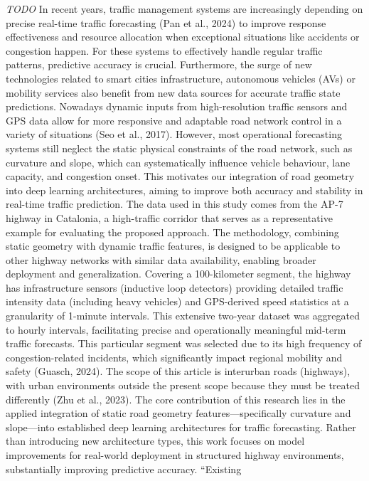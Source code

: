 \documentclass[
  letterpaper,
  DIV=11,
  numbers=noendperiod]{scrartcl}
\begin{document}
\emph{TODO} In recent years, traffic management systems are increasingly
depending on precise real-time traffic forecasting (Pan et al., 2024) to
improve response effectiveness and resource allocation when exceptional
situations like accidents or congestion happen. For these systems to
effectively handle regular traffic patterns, predictive accuracy is
crucial. Furthermore, the surge of new technologies related to smart
cities infrastructure, autonomous vehicles (AVs) or mobility services
also benefit from new data sources for accurate traffic state
predictions. Nowadays dynamic inputs from high-resolution traffic
sensors and GPS data allow for more responsive and adaptable road
network control in a variety of situations (Seo et al., 2017). However,
most operational forecasting systems still neglect the static physical
constraints of the road network, such as curvature and slope, which can
systematically influence vehicle behaviour, lane capacity, and
congestion onset. This motivates our integration of road geometry into
deep learning architectures, aiming to improve both accuracy and
stability in real-time traffic prediction. The data used in this study
comes from the AP-7 highway in Catalonia, a high-traffic corridor that
serves as a representative example for evaluating the proposed approach.
The methodology, combining static geometry with dynamic traffic
features, is designed to be applicable to other highway networks with
similar data availability, enabling broader deployment and
generalization. Covering a 100-kilometer segment, the highway has
infrastructure sensors (inductive loop detectors) providing detailed
traffic intensity data (including heavy vehicles) and GPS-derived speed
statistics at a granularity of 1-minute intervals. This extensive
two-year dataset was aggregated to hourly intervals, facilitating
precise and operationally meaningful mid-term traffic forecasts. This
particular segment was selected due to its high frequency of
congestion-related incidents, which significantly impact regional
mobility and safety (Guasch, 2024). The scope of this article is
interurban roads (highways), with urban environments outside the present
scope because they must be treated differently (Zhu et al., 2023). The
core contribution of this research lies in the applied integration of
static road geometry features---specifically curvature and slope---into
established deep learning architectures for traffic forecasting. Rather
than introducing new architecture types, this work focuses on model
improvements for real-world deployment in structured highway
environments, substantially improving predictive accuracy. ``Existing
\end{document}
